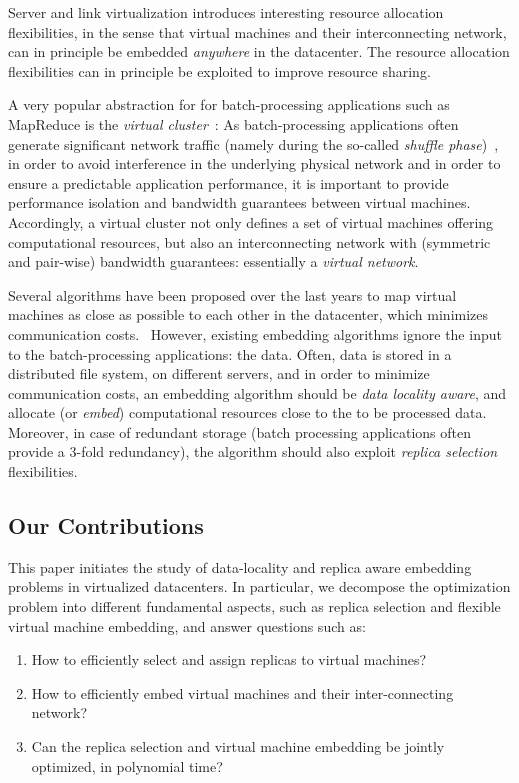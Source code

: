 \documentclass[9pt,twocolumn]{scrartcl}
\begin{document}
Server and link virtualization introduces interesting resource allocation flexibilities,
in the sense that virtual machines and their interconnecting network,
can in principle be embedded \emph{anywhere} in the datacenter.
The resource allocation flexibilities
can in principle be exploited to improve resource sharing.

A very popular abstraction for for batch-processing applications such as MapReduce is the \emph{virtual cluster}~\cite{oktopus}:
As batch-processing applications often generate significant
network traffic (namely during the so-called \emph{shuffle phase})~\cite{amazonbw},
in order to avoid interference in the underlying physical network and in order to ensure a predictable
application performance,
it is important to provide performance isolation and bandwidth guarantees between virtual machines.~\cite{talk-about}
Accordingly, a virtual cluster not only defines a set of virtual machines offering computational resources,
but also an interconnecting network with (symmetric and pair-wise) bandwidth guarantees: essentially a \emph{virtual network}.

Several algorithms have been proposed over the last years to map virtual machines as close as possible
to each other in the datacenter, which minimizes communication costs.~\cite{oktopus,proteus}
However, existing embedding algorithms ignore the input to the batch-processing applications:
the data. Often, data is stored in a distributed file system, on different servers,
and in order to minimize
communication costs, an embedding algorithm should be \emph{data locality aware},
and allocate (or \emph{embed}) computational resources close to the to be processed data. Moreover, in case of redundant storage (batch processing
applications often provide a 3-fold redundancy), the algorithm should also exploit \emph{replica selection}
flexibilities.

\subsection{Our Contributions}

This paper initiates the study of data-locality and replica aware embedding problems in virtualized datacenters.
In particular, we decompose the optimization problem into different fundamental aspects, such as
replica selection and flexible virtual machine embedding, and answer questions such as:
\begin{enumerate}
\item How to efficiently select and assign replicas to virtual machines?

\item How to efficiently embed virtual machines and their inter-connecting network?

\item Can the replica selection and virtual machine embedding be jointly optimized, in polynomial time?
\end{enumerate}
\end{document}
